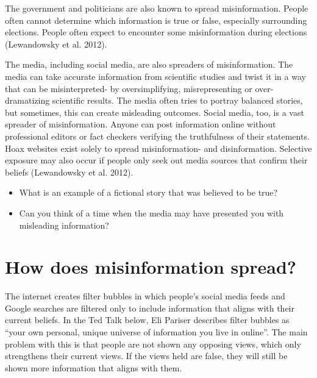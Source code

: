 \documentclass[
  letterpaper,
  DIV=11,
  numbers=noendperiod]{scrreprt}
\begin{document}
The government and politicians are also known to spread misinformation.
People often cannot determine which information is true or false,
especially surrounding elections. People often expect to encounter some
misinformation during elections (Lewandowsky et al. 2012).

The media, including social media, are also spreaders of misinformation.
The media can take accurate information from scientific studies and
twist it in a way that can be misinterpreted- by oversimplifying,
misrepresenting or over-dramatizing scientific results. The media often
tries to portray balanced stories, but sometimes, this can create
misleading outcomes. Social media, too, is a vast spreader of
misinformation. Anyone can post information online without professional
editors or fact checkers verifying the truthfulness of their statements.
Hoax websites exist solely to spread misinformation- and disinformation.
Selective exposure may also occur if people only seek out media sources
that confirm their beliefs (Lewandowsky et al. 2012).

\begin{tcolorbox}[enhanced jigsaw, arc=.35mm, bottomrule=.15mm, bottomtitle=1mm, breakable, colback=white, colbacktitle=quarto-callout-tip-color!10!white, colframe=quarto-callout-tip-color-frame, coltitle=black, left=2mm, leftrule=.75mm, opacityback=0, opacitybacktitle=0.6, rightrule=.15mm, title=\textcolor{quarto-callout-tip-color}{\faLightbulb}\hspace{0.5em}{Pause and Reflect}, titlerule=0mm, toprule=.15mm, toptitle=1mm]

\begin{itemize}
\item
  What is an example of a fictional story that was believed to be true?
\item
  Can you think of a time when the media may have presented you with
  misleading information?
\end{itemize}

\end{tcolorbox}

\section{How does misinformation
spread?}\label{how-does-misinformation-spread}

The internet creates filter bubbles in which people's social media feeds
and Google searches are filtered only to include information that aligns
with their current beliefs. In the Ted Talk below, Eli Pariser describes
filter bubbles as ``your own personal, unique universe of information
you live in online''. The main problem with this is that people are not
shown any opposing views, which only strengthens their current views. If
the views held are false, they will still be shown more information that
aligns with them.
\end{document}
